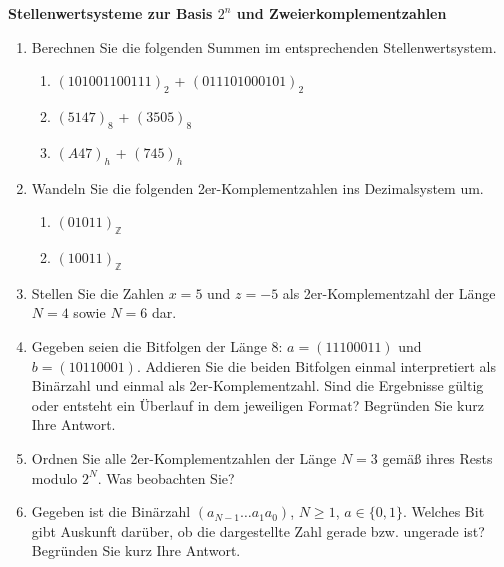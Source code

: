 \textbf{Stellenwertsysteme zur Basis $2^n$ und Zweierkomplementzahlen}
\begin{enumerate}
	\item Berechnen Sie die folgenden Summen im entsprechenden Stellenwertsystem.
		\begin{enumerate}
			\item $(1010 0110 0111)_2$ + $(0111 0100 0101)_2$
			\item $(5147)_8$ + $(3505)_8$
			\item $(A47)_h$ + $(745)_h$ 
		\end{enumerate}
	\item Wandeln Sie die folgenden 2er-Komplementzahlen ins Dezimalsystem um.
		\begin{enumerate}
			\item $(01011)_{\mathbb{Z}}$
			\item $(10011)_{\mathbb{Z}}$
		\end{enumerate}
	\item Stellen Sie die Zahlen $x = 5$ und $z = -5$ als 2er-Komplementzahl der Länge $N = 4$ sowie $N = 6$ dar.
	\item Gegeben seien die Bitfolgen der Länge 8: $a = (11100011)$ und $b = (10110001)$. Addieren Sie die beiden Bitfolgen einmal interpretiert als Binärzahl und einmal als 2er-Komplementzahl. Sind die Ergebnisse gültig oder entsteht ein Überlauf in dem jeweiligen Format? Begründen Sie kurz Ihre Antwort.
	\item Ordnen Sie alle 2er-Komplementzahlen der Länge $N = 3$ gemäß ihres Rests modulo $2^N$. Was beobachten Sie?
	\item Gegeben ist die Binärzahl $(a_{N-1}\dots a_1 a_0)$, $N \geq 1$, $a \in \lbrace 0,1 \rbrace$. Welches Bit gibt Auskunft darüber, ob die dargestellte Zahl gerade bzw. ungerade ist? Begründen Sie kurz Ihre Antwort.
\end{enumerate}